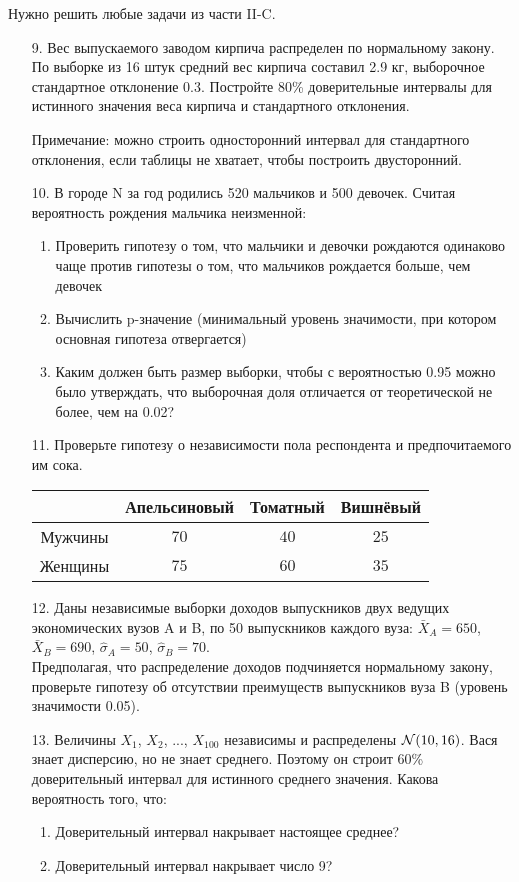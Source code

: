 Нужно решить любые \textbf{} задачи из части II-C.

\begin{enumerate}
\item[9.] Вес выпускаемого заводом кирпича распределен по нормальному закону. По выборке из 16 штук средний вес кирпича составил 2.9 кг, выборочное стандартное отклонение 0.3. Постройте 80\% доверительные интервалы для истинного значения веса кирпича и стандартного отклонения.

Примечание: можно строить односторонний интервал для стандартного отклонения, если таблицы не хватает, чтобы построить двусторонний.

\item[10.] В городе N за год родились 520 мальчиков и 500 девочек. Считая вероятность рождения мальчика неизменной:
\begin{enumerate}
\item Проверить гипотезу о том, что мальчики и девочки рождаются одинаково чаще против гипотезы о том, что мальчиков рождается больше, чем девочек
\item Вычислить p-значение (минимальный уровень значимости, при котором основная гипотеза отвергается)
\item Каким должен быть размер выборки, чтобы с вероятностью 0.95 можно было утверждать, что выборочная доля отличается от теоретической не более, чем на 0.02?
\end{enumerate}

\item[11.] Проверьте гипотезу о независимости пола респондента и предпочитаемого им сока.

\begin{tabular}{@{}cccc@{}}
\toprule
  & Апельсиновый & Томатный & Вишнёвый \\ \midrule
Мужчины & $70$         & $40$     & $25$     \\
Женщины & $75$         & $60$     & $35$     \\ \bottomrule
\end{tabular}

\item[12.] Даны независимые выборки доходов выпускников двух ведущих экономических вузов A и B, по 50 выпускников каждого вуза: $\bar{X}_{A}=650$, $\bar{X}_{B}=690$, $\hat{\sigma}_{A}=50$, $\hat{\sigma}_{B}=70$. \\ Предполагая, что распределение доходов подчиняется нормальному закону, проверьте гипотезу об отсутствии преимуществ выпускников вуза B (уровень значимости 0.05).

\item[13.] Величины $X_{1}$, $X_{2}$, ..., $X_{100}$ независимы и распределены $\mathcal{N}(10,16)$. Вася знает дисперсию, но не знает среднего. Поэтому он строит 60\% доверительный интервал для истинного среднего значения. Какова вероятность того, что:
\begin{enumerate}
\item Доверительный интервал накрывает настоящее среднее?
\item Доверительный интервал накрывает число 9?
\end{enumerate}
\end{enumerate}

